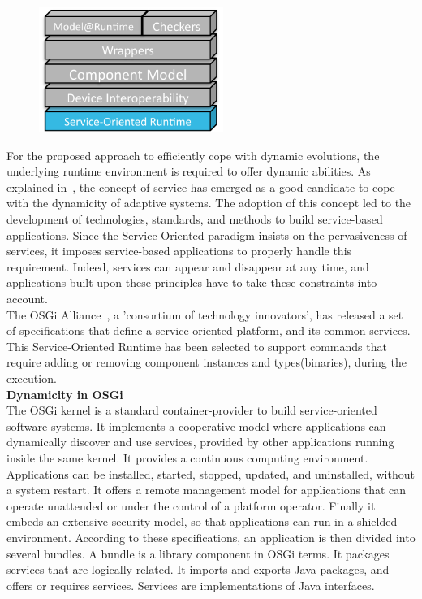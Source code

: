 \begin{figure}
  \vspace{-5mm}
  \includegraphics[width=60mm]{part2/pics/layers/SoaRt}
  \vspace{-5mm}
\end{figure}

For the proposed approach to efficiently cope with dynamic evolutions, the underlying runtime environment is required to offer dynamic abilities. As explained in~\cite{Di-Nitto:2008}, the concept of service has emerged as a good candidate to cope with the dynamicity of adaptive systems. The adoption of this concept led to the development of technologies, standards, and methods to build service-based applications. Since the Service-Oriented paradigm insists on the pervasiveness of services, it imposes service-based applications to properly handle this requirement. Indeed, services can appear and disappear at any time, and applications built upon these principles have to take these constraints into account.\\

The OSGi Alliance~\cite{OSGI:r4}, a 'consortium of technology innovators', has released a set of specifications that define a service-oriented platform, and its common services. This Service-Oriented Runtime has been selected to support commands that require adding or removing component instances and types(binaries), during the execution.\\

{\bf Dynamicity in OSGi}\\
The OSGi kernel is a standard container-provider to build service-oriented software systems. It implements a cooperative model where applications can dynamically discover and use services, provided by other applications running inside the same kernel. It provides a continuous computing environment. Applications can be installed, started, stopped, updated, and uninstalled, without a system restart. It offers a remote management model for applications that can operate unattended or under the control of a platform operator. Finally it embeds an extensive security model, so that applications can run in a shielded environment. According to these specifications, an application is then divided into several bundles. A bundle is a library component in OSGi terms. It packages services that are logically related. It imports and exports Java packages, and offers or requires services. Services are implementations of Java interfaces.\\

